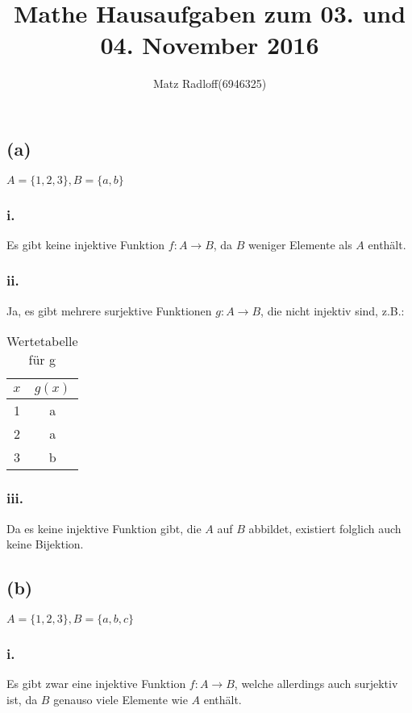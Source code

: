 \documentclass[11pt,a4paper]{article}
\title{\textbf{Mathe Hausaufgaben zum 03. und 04. November 2016}}
\author{Matz Radloff(6946325)}
\begin{document}
  \maketitle
  \date{}
  \tableofcontents
  \newpage

\section{}

\subsection{(a)}
$A = \{1,2,3\}, B = \{a,b\}$

\subsubsection{i.}
Es gibt keine injektive Funktion $f : A \rightarrow B$, da $B$ weniger Elemente als $A$ enthält.

\subsubsection{ii.}
Ja, es gibt mehrere surjektive Funktionen $g : A \rightarrow B$, die nicht injektiv sind, z.B.:

\begin{table}[!th]
\begin{tabular}{|c|c|}
\hline
$x$ & $g(x)$\\
\hline
1 & a \\
2 & a \\
3 & b \\
\hline
\end{tabular}
\caption{Wertetabelle für g}
\label{ex:table}
\end{table}

\subsubsection{iii.}
Da es keine injektive Funktion gibt, die $A$ auf $B$ abbildet, existiert folglich auch keine Bijektion.


\subsection{(b)}
$A = \{1,2,3\}, B = \{a,b,c\}$

\subsubsection{i.}
Es gibt zwar eine injektive Funktion $f : A \rightarrow B$, welche allerdings auch surjektiv ist, da $B$ genauso viele Elemente wie $A$ enthält.
\end{document}
